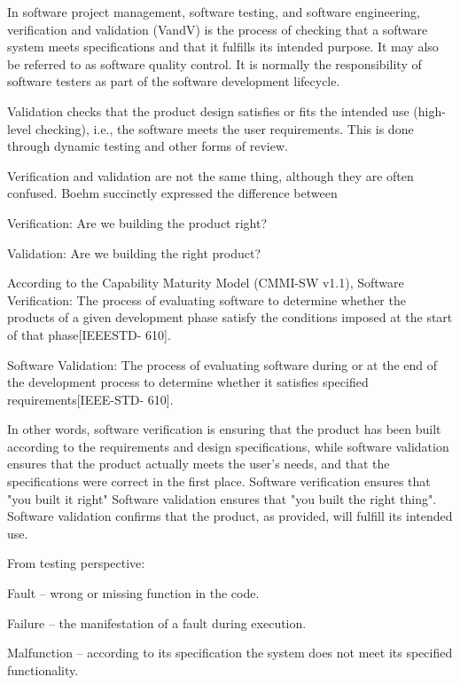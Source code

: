 In software project management, software testing, and software engineering, verification and validation (VandV) is the process of checking that a software system meets specifications and that it fulfills its intended purpose. It may also be referred to as software quality control. It is normally the responsibility of software testers as part of the software development lifecycle.

Validation checks that the product design satisfies or fits the intended use (high-level
checking), i.e., the software meets the user requirements. This is done through dynamic
testing and other forms of review.

Verification and validation are not the same thing, although they are often confused. Boehm
succinctly expressed the difference between

Verification: Are we building the product right?

Validation: Are we building the right product?

According to the Capability Maturity Model (CMMI-SW v1.1),
Software Verification: The process of evaluating software to determine whether the products
of a given development phase satisfy the conditions imposed at the start of that phase[IEEESTD-
610].

Software Validation: The process of evaluating software during or at the end of the
development process to determine whether it satisfies specified requirements[IEEE-STD-
610].

In other words, software verification is ensuring that the product has been built according to
the requirements and design specifications, while software validation ensures that the
product actually meets the user's needs, and that the specifications were correct in the first
place. Software verification ensures that "you built it right" Software validation ensures that
"you built the right thing". Software validation confirms that the product, as provided, will
fulfill its intended use.

From testing perspective:

Fault – wrong or missing function in the code.

Failure – the manifestation of a fault during execution.

Malfunction – according to its specification the system does not meet its specified
functionality.

